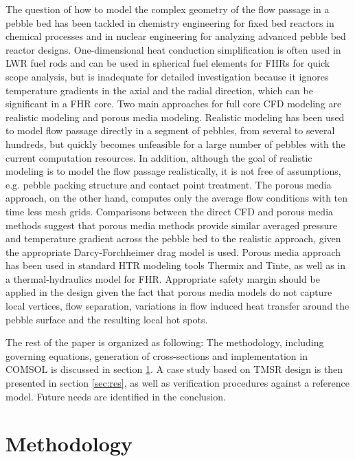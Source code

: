 \documentclass{elsarticle}
\begin{document}
The question of how to model the complex geometry of the flow passage in a pebble bed has been tackled in chemistry engineering\cite{Dixon2001}\cite{Miroliaei2011} for fixed bed reactors in chemical processes and in nuclear engineering for analyzing advanced pebble bed reactor designs.  One-dimensional heat conduction simplification is often used in LWR fuel rods and can be used in spherical fuel elements for FHRs for quick scope analysis, but is inadequate for detailed investigation because it ignores temperature gradients in the axial and the radial direction, which can be significant in a FHR core. Two main approaches for full core CFD modeling are realistic modeling and porous media modeling. Realistic modeling has been used to model flow passage directly in a segment of pebbles, from several to several hundreds\cite{Lee2007}\cite{Hassana}\cite{Shams2013}, but quickly becomes unfeasible for a large number of pebbles with the current computation resources. In addition, although the goal of realistic modeling is to model the flow passage realistically, it is not free of assumptions\cite{Lee2007}, e.g. pebble packing structure and contact point treatment. The porous media approach, on the other hand, computes only the average flow conditions with ten time less mesh grids. Comparisons between the direct CFD and porous media methods\cite{Wu2010} suggest that porous media methods provide similar averaged pressure and temperature gradient across the pebble bed to the realistic approach, given the appropriate Darcy-Forchheimer drag model is used. Porous media approach has been used in standard HTR modeling tools Thermix\cite{Struth1985} and Tinte\cite{Gerwin1987}, as well as in a thermal-hydraulics model for FHR\cite{Scarlat2012}.
Appropriate safety margin should be applied in the design given the fact that porous media models do not capture local vertices, flow separation, variations in flow induced heat transfer around the pebble surface and the resulting local hot spots.


The rest of the paper is organized as following: The methodology, including governing equations, generation of cross-sections and implementation in COMSOL is discussed in section \ref{sec:methodology}. A case study based on TMSR design is then presented in section \ref{sec:res}, as well as verification procedures against a reference model. Future needs are identified in the conclusion.

\section{Methodology}
\label{sec:methodology}
\end{document}
